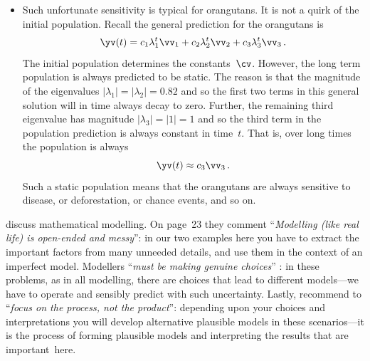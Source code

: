 \begin{example}
\begin{solution}
\begin{itemize}
\item Such unfortunate sensitivity is typical for orangutans.  
It is not a quirk of the initial population.
Recall the general prediction for the orangutans is 
\begin{equation*}
\yv(t)=c_1\lambda_1^t\vv_1+c_2\lambda_2^t\vv_2+c_3\lambda_3^t\vv_3\,.
\end{equation*}
The initial population determines the constants~\(\cv\).
However, the long term population is always predicted to be static.
The reason is that the magnitude of the eigenvalues \(|\lambda_1|=|\lambda_2|=0.82\) and so the first two terms in this general solution will in time always decay to zero.
Further, the remaining third eigenvalue has magnitude \(|\lambda_3|=|1|=1\) and so the third term in the population prediction is always constant in time~\(t\).
That is, over long times the population is always
\begin{equation*}
\yv(t)\approx c_3\vv_3\,.
\end{equation*}
Such a static population means that the orangutans are always sensitive to  disease, or deforestation, or chance events, and so on.

\end{itemize}
\end{solution}
\end{example}




\cite{gaimme2016} discuss mathematical modelling.
On page~23 they comment ``\emph{Modelling (like real life) is open-ended and messy}'': in our two examples here you have to extract the important factors from many unneeded details, and use them in the context of an imperfect model.
Modellers ``\emph{must be making genuine choices}'' \cite[p.23]{gaimme2016}: in these problems, as in all modelling, there are choices that lead to different models---we have to operate and sensibly predict with such uncertainty.
Lastly, \cite{gaimme2016} recommend to ``\emph{focus on the process, not the product}'': depending upon your choices and interpretations you will develop alternative plausible models in these scenarios---it is the process of forming plausible models and interpreting the results that are important~here.



